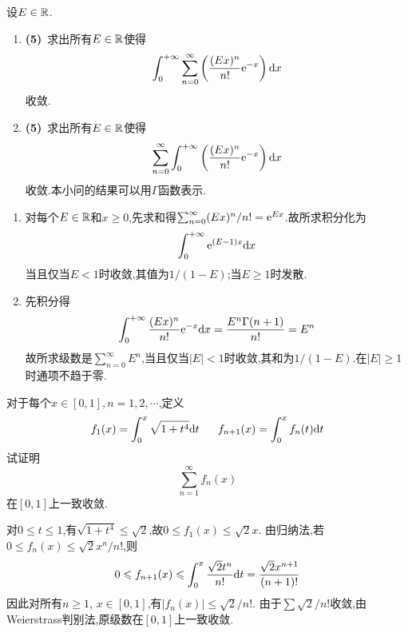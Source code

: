 \documentclass{ctexart}
\begin{document}
\begin{problem}[5.(10\songti{分})]
设$E\in\mathbb{R}$.
        \begin{enumerate}[label=\tbf{(\arabic*)},topsep=0pt,parsep=0pt,itemsep=0pt,partopsep=0pt]
            \item \textbf{(5)}\ 求出所有$E\in\mathbb{R}$使得
                \[\int_0^{+\infty}\sum_{n=0}^{\infty}\left(\dfrac{(Ex)^n}{n!}\mathrm{e}^{-x}\right)\mathrm{d} x\]
                收敛.
            \item \textbf{(5)}\ 求出所有$E\in\mathbb{R}$使得
                \[\sum_{n=0}^{\infty}\int_0^{+\infty}\left(\dfrac{(Ex)^n}{n!}\mathrm{e}^{-x}\right)\mathrm{d} x\]
                收敛.本小问的结果可以用$\Gamma$函数表示.
        \end{enumerate}
\end{problem}
\begin{solution}
\begin{enumerate}[label=\tbf{(\arabic*)},topsep=0pt,parsep=0pt,itemsep=0pt,partopsep=0pt]
\item 对每个$E\in\mathbb{R}$和$x\geqslant0$,先求和得$\sum_{n=0}^{\infty}(Ex)^n/n!=\mathrm{e}^{Ex}$.故所求积分化为
\[\int_0^{+\infty}\mathrm{e}^{(E-1)x}\mathrm{d} x\]
当且仅当$E<1$时收敛,其值为$1/(1-E)$;当$E\geqslant1$时发散.
\item 先积分得
\[\int_0^{+\infty}\frac{(Ex)^n}{n!}\mathrm{e}^{-x}\mathrm{d} x
=\frac{E^n\Gamma(n+1)}{n!}=E^n\]
故所求级数是$\sum_{n=0}^{\infty}E^n$,当且仅当$|E|<1$时收敛,其和为$1/(1-E)$.在$|E|\geqslant1$时通项不趋于零.
\end{enumerate}
\end{solution}

\begin{problem}[6.(10\songti{分})]
对于每个$x\in[0,1],n=1,2,\cdots$,定义
        \[f_1(x)=\int_0^x\sqrt{1+t^4}\di t\ \ \ \ \ f_{n+1}(x)=\int_0^xf_n(t)\di t\]
        试证明
        \[\sum_{n=1}^{\infty}f_n(x)\]
        在$[0,1]$上一致收敛.
\end{problem}
\begin{solution}
对$0\leqslant t\leqslant1$,有$\sqrt{1+t^4}\leqslant\sqrt2$,故$0\leqslant f_1(x)\leqslant\sqrt2x$.
由归纳法,若$0\leqslant f_n(x)\leqslant\sqrt2x^n/n!$,则
\[0\leqslant f_{n+1}(x)\leqslant\int_0^x\frac{\sqrt2t^n}{n!}\mathrm{d} t
=\frac{\sqrt2x^{n+1}}{(n+1)!}\]
因此对所有$n\geqslant1$, $x\in[0,1]$,有$|f_n(x)|\leqslant\sqrt2/n!$.
由于$\sum\sqrt2/n!$收敛,由Weierstrass判别法,原级数在$[0,1]$上一致收敛.
\end{solution}
\end{document}
